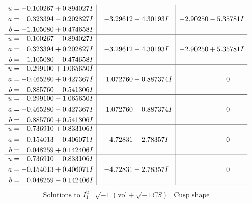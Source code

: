 \documentclass[1p]{elsarticle_modified}
\theoremstyle{definition}
\newcommand{\I}{\sqrt{-1}}
\begin{document}
$$\begin{array}{c|c|c}
\begin{aligned}
u &= -0.100267 + 0.894027 I \\
a &= \phantom{-}0.323394 - 0.202827 I \\
b &= -1.105080 + 0.474658 I\end{aligned}
 & -3.29612 + 4.30193 I & -2.90250 - 5.35781 I \\ \hline\begin{aligned}
u &= -0.100267 - 0.894027 I \\
a &= \phantom{-}0.323394 + 0.202827 I \\
b &= -1.105080 - 0.474658 I\end{aligned}
 & -3.29612 - 4.30193 I & -2.90250 + 5.35781 I \\ \hline\begin{aligned}
u &= \phantom{-}0.299100 + 1.065650 I \\
a &= -0.465280 + 0.427367 I \\
b &= \phantom{-}0.885760 - 0.541306 I\end{aligned}
 & \phantom{-}1.072760 + 0.887374 I & \phantom{-0.000000 } 0 \\ \hline\begin{aligned}
u &= \phantom{-}0.299100 - 1.065650 I \\
a &= -0.465280 - 0.427367 I \\
b &= \phantom{-}0.885760 + 0.541306 I\end{aligned}
 & \phantom{-}1.072760 - 0.887374 I & \phantom{-0.000000 } 0 \\ \hline\begin{aligned}
u &= \phantom{-}0.736910 + 0.833106 I \\
a &= -0.154013 - 0.406071 I \\
b &= \phantom{-}0.048259 + 0.142406 I\end{aligned}
 & -4.72831 - 2.78357 I & \phantom{-0.000000 } 0 \\ \hline\begin{aligned}
u &= \phantom{-}0.736910 - 0.833106 I \\
a &= -0.154013 + 0.406071 I \\
b &= \phantom{-}0.048259 - 0.142406 I\end{aligned}
 & -4.72831 + 2.78357 I & \phantom{-0.000000 } 0\\
 \hline 
 \end{array}$$\newpage$$\begin{array}{c|c|c}  
\text{Solutions to }I^u_{1}& \I (\text{vol} + \sqrt{-1}CS) & \text{Cusp shape}\\
 \hline 
\begin{aligned}

\end{aligned}
\end{array}$$
\end{document}
